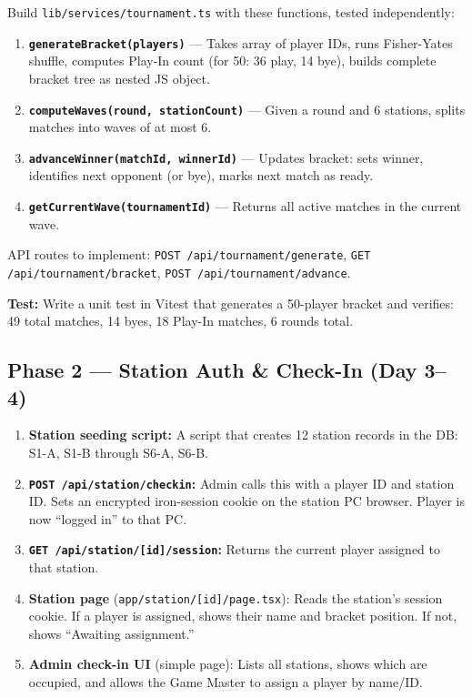 \documentclass[11pt, a4paper]{article}
\begin{document}
\begin{tcolorbox}[phasebox=sectionblue, title={Goal: Complete bracket logic with no UI}]
Build \texttt{lib/services/tournament.ts} with these functions, tested independently:
\begin{enumerate}[leftmargin=1cm, itemsep=3pt]
    \item \textbf{\texttt{generateBracket(players)}} --- Takes array of player IDs, runs Fisher-Yates shuffle, computes Play-In count (for 50: 36 play, 14 bye), builds complete bracket tree as nested JS object.
    \item \textbf{\texttt{computeWaves(round, stationCount)}} --- Given a round and 6 stations, splits matches into waves of at most 6.
    \item \textbf{\texttt{advanceWinner(matchId, winnerId)}} --- Updates bracket: sets winner, identifies next opponent (or bye), marks next match as ready.
    \item \textbf{\texttt{getCurrentWave(tournamentId)}} --- Returns all active matches in the current wave.
\end{enumerate}
API routes to implement: \texttt{POST /api/tournament/generate}, \texttt{GET /api/tournament/bracket}, \texttt{POST /api/tournament/advance}.
\end{tcolorbox}

\textbf{Test:} Write a unit test in Vitest that generates a 50-player bracket and verifies: 49 total matches, 14 byes, 18 Play-In matches, 6 rounds total.

\subsection{Phase 2 --- Station Auth \& Check-In (Day 3--4)}

\begin{tcolorbox}[phasebox=successgreen, title={Goal: Station-based login flow, no passwords}]
\begin{enumerate}[leftmargin=1cm, itemsep=3pt]
    \item \textbf{Station seeding script:} A script that creates 12 station records in the DB: S1-A, S1-B through S6-A, S6-B.
    \item \textbf{\texttt{POST /api/station/checkin}:} Admin calls this with a player ID and station ID. Sets an encrypted iron-session cookie on the station PC browser. Player is now ``logged in'' to that PC.
    \item \textbf{\texttt{GET /api/station/[id]/session}:} Returns the current player assigned to that station.
    \item \textbf{Station page} (\texttt{app/station/[id]/page.tsx}): Reads the station's session cookie. If a player is assigned, shows their name and bracket position. If not, shows ``Awaiting assignment.''
    \item \textbf{Admin check-in UI} (simple page): Lists all stations, shows which are occupied, and allows the Game Master to assign a player by name/ID.
\end{enumerate}
\end{tcolorbox}
\end{document}
